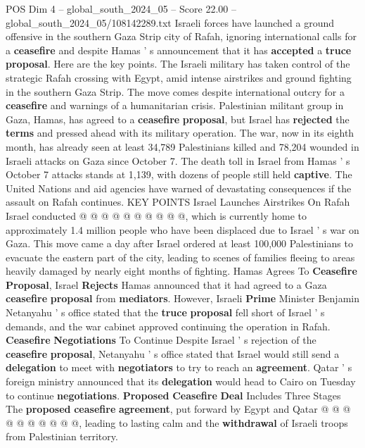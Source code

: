 \begin{textsample}{POS Dim 4 – global\_south\_2024\_05 – Score 22.00 – global\_south\_2024\_05/108142289.txt}  \label{ex:f4_pos_208}
Israeli forces have launched a ground offensive in the southern Gaza Strip city of Rafah, ignoring international calls for a \textbf{ceasefire} and despite Hamas ' s announcement that it has \textbf{accepted} a \textbf{truce} \textbf{proposal}.
Here are the key points.
The Israeli military has taken control of the strategic Rafah crossing with Egypt, amid intense airstrikes and ground fighting in the southern Gaza Strip.
The move comes despite international outcry for a \textbf{ceasefire} and warnings of a humanitarian crisis.
Palestinian militant group in Gaza, Hamas, has agreed to a \textbf{ceasefire} \textbf{proposal}, but Israel has \textbf{rejected} the \textbf{terms} and pressed ahead with its military operation.
The war, now in its eighth month, has already seen at least 34,789 Palestinians killed and 78,204 wounded in Israeli attacks on Gaza since October 7.
The death toll in Israel from Hamas ' s October 7 attacks stands at 1,139, with dozens of people still held \textbf{captive}.
The United Nations and aid agencies have warned of devastating consequences if the assault on Rafah continues.
KEY POINTS Israel Launches Airstrikes On Rafah Israel conducted @ @ @ @ @ @ @ @ @ @, which is currently home to approximately 1.4 million people who have been displaced due to Israel ' s war on Gaza.
This move came a day after Israel ordered at least 100,000 Palestinians to evacuate the eastern part of the city, leading to scenes of families fleeing to areas heavily damaged by nearly eight months of fighting.
Hamas Agrees To \textbf{Ceasefire} \textbf{Proposal}, Israel \textbf{Rejects} Hamas announced that it had agreed to a Gaza \textbf{ceasefire} \textbf{proposal} from \textbf{mediators}.
However, Israeli \textbf{Prime} Minister Benjamin Netanyahu ' s office stated that the \textbf{truce} \textbf{proposal} fell short of Israel ' s demands, and the war cabinet approved continuing the operation in Rafah. \textbf{Ceasefire} \textbf{Negotiations} To Continue Despite Israel ' s rejection of the \textbf{ceasefire} \textbf{proposal}, Netanyahu ' s office stated that Israel would still send a \textbf{delegation} to meet with \textbf{negotiators} to try to reach an \textbf{agreement}.
Qatar ' s foreign ministry announced that its \textbf{delegation} would head to Cairo on Tuesday to continue \textbf{negotiations}. \textbf{Proposed} \textbf{Ceasefire} \textbf{Deal} Includes Three Stages The \textbf{proposed} \textbf{ceasefire} \textbf{agreement}, put forward by Egypt and Qatar @ @ @ @ @ @ @ @ @ @, leading to lasting calm and the \textbf{withdrawal} of Israeli troops from Palestinian territory.

\end{textsample}
